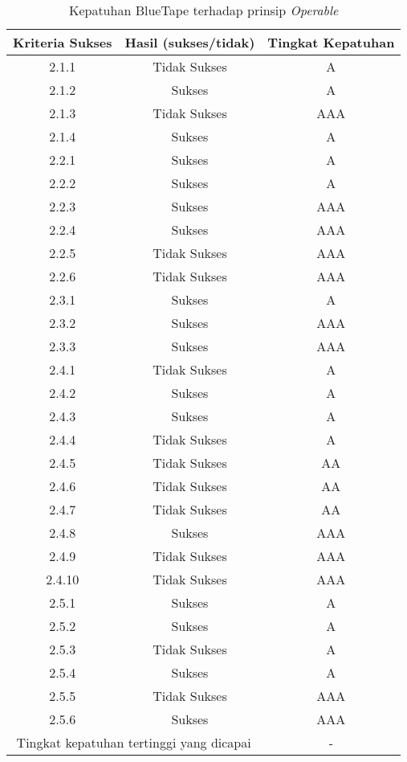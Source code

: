 \begin{table}[H]
    \centering 
    \caption{Kepatuhan BlueTape terhadap prinsip \textit{Operable}}
    \label{tab:kepatuhan_bluetape_operable}
    \begin{tabular}{|c|c|c|}
        \toprule
        Kriteria Sukses & Hasil (sukses/tidak) & Tingkat Kepatuhan\\

        \midrule
        \rowcolor{darkred} 2.1.1 & Tidak Sukses & A \\
        2.1.2 & Sukses & A \\
        \rowcolor{pink} 2.1.3 & Tidak Sukses & AAA \\
        2.1.4 & Sukses & A \\
        2.2.1 & Sukses & A \\
        2.2.2 & Sukses & A \\
        2.2.3 & Sukses & AAA \\
        2.2.4 & Sukses & AAA \\
        \rowcolor{pink} 2.2.5 & Tidak Sukses & AAA \\
        \rowcolor{pink} 2.2.6 & Tidak Sukses & AAA \\
        2.3.1 & Sukses & A \\
        2.3.2 & Sukses & AAA \\
        2.3.3 & Sukses & AAA \\
        \rowcolor{darkred} 2.4.1 & Tidak Sukses & A \\
        2.4.2 & Sukses & A \\
        2.4.3 & Sukses & A \\
        \rowcolor{darkred} 2.4.4 & Tidak Sukses & A \\
        \rowcolor{brightred} 2.4.5 & Tidak Sukses & AA \\
        \rowcolor{brightred} 2.4.6 & Tidak Sukses & AA \\
        \rowcolor{brightred} 2.4.7 & Tidak Sukses & AA \\
        2.4.8 & Sukses & AAA \\
        \rowcolor{pink} 2.4.9 & Tidak Sukses & AAA \\
        \rowcolor{pink} 2.4.10 & Tidak Sukses & AAA \\
        2.5.1 & Sukses & A \\
        2.5.2 & Sukses & A \\
        \rowcolor{darkred} 2.5.3 & Tidak Sukses & A \\
        2.5.4 & Sukses & A \\
        \rowcolor{pink} 2.5.5 & Tidak Sukses & AAA \\
        2.5.6 & Sukses & AAA \\

        \bottomrule
        \multicolumn{2}{|c|}{Tingkat kepatuhan tertinggi yang dicapai} & - \\
        \bottomrule

    \end{tabular}
\end{table}

